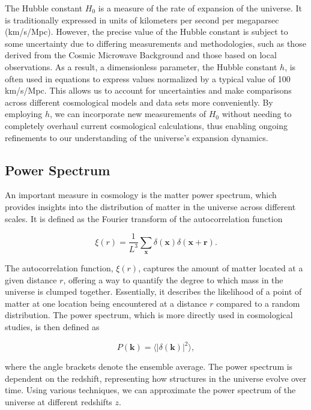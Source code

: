 \documentclass{article}
\begin{document}
The Hubble constant \(H_0\) is a measure of the rate of expansion of the universe. It is traditionally expressed in units of kilometers per second per megaparsec (km/s/Mpc). However, the precise value of the Hubble constant is subject to some uncertainty due to differing measurements and methodologies, such as those derived from the Cosmic Microwave Background and those based on local observations. As a result, a dimensionless parameter, the Hubble constant \(h\), is often used in equations to express values normalized by a typical value of 100 km/s/Mpc. This allows us to account for uncertainties and make comparisons across different cosmological models and data sets more conveniently. By employing \(h\), we can incorporate new measurements of \(H_0\) without needing to completely overhaul current cosmological calculations, thus enabling ongoing refinements to our understanding of the universe's expansion dynamics.

\subsection{Power Spectrum}
\label{power-spectrum}
An important measure in cosmology is the matter power spectrum, which provides insights into the distribution of matter in the universe across different scales. It is defined as the Fourier transform of the autocorrelation function

\begin{equation}
\xi(r) = \frac{1}{L^3} \sum_{\mathbf{x}} \delta(\mathbf{x}) \delta(\mathbf{x} + \mathbf{r}).
\end{equation}

The autocorrelation function, \(\xi(r)\), captures the amount of matter located at a given distance \(r\), offering a way to quantify the degree to which mass in the universe is clumped together. Essentially, it describes the likelihood of a point of matter at one location being encountered at a distance \(r\) compared to a random distribution. The power spectrum, which is more directly used in cosmological studies, is then defined as \citep{cui2008ideal}

\begin{equation}
    P(\mathbf{k}) = \langle |\delta(\mathbf{k})|^2 \rangle,
\end{equation}

where the angle brackets denote the ensemble average. The power spectrum is dependent on the redshift, representing how structures in the universe evolve over time. Using various techniques, we can approximate the power spectrum of the universe at different redshifts \(z\). 
\end{document}
